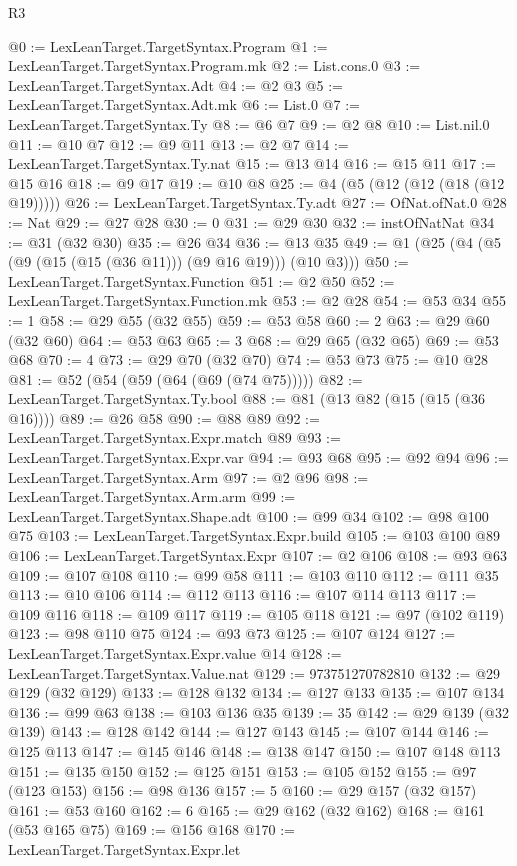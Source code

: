 \begin{lexlean}{R3}
\begin{coremodule}
@0 := LexLeanTarget.TargetSyntax.Program
@1 := LexLeanTarget.TargetSyntax.Program.mk
@2 := List.cons.{0}
@3 := LexLeanTarget.TargetSyntax.Adt
@4 := @2 @3
@5 := LexLeanTarget.TargetSyntax.Adt.mk
@6 := List.{0}
@7 := LexLeanTarget.TargetSyntax.Ty
@8 := @6 @7
@9 := @2 @8
@10 := List.nil.{0}
@11 := @10 @7
@12 := @9 @11
@13 := @2 @7
@14 := LexLeanTarget.TargetSyntax.Ty.nat
@15 := @13 @14
@16 := @15 @11
@17 := @15 @16
@18 := @9 @17
@19 := @10 @8
@25 := @4 (@5 (@12 (@12 (@18 (@12 @19)))))
@26 := LexLeanTarget.TargetSyntax.Ty.adt
@27 := OfNat.ofNat.{0}
@28 := Nat
@29 := @27 @28
@30 := 0
@31 := @29 @30
@32 := instOfNatNat
@34 := @31 (@32 @30)
@35 := @26 @34
@36 := @13 @35
@49 := @1 (@25 (@4 (@5 (@9 (@15 (@15 (@36 @11))) (@9 @16 @19))) (@10 @3)))
@50 := LexLeanTarget.TargetSyntax.Function
@51 := @2 @50
@52 := LexLeanTarget.TargetSyntax.Function.mk
@53 := @2 @28
@54 := @53 @34
@55 := 1
@58 := @29 @55 (@32 @55)
@59 := @53 @58
@60 := 2
@63 := @29 @60 (@32 @60)
@64 := @53 @63
@65 := 3
@68 := @29 @65 (@32 @65)
@69 := @53 @68
@70 := 4
@73 := @29 @70 (@32 @70)
@74 := @53 @73
@75 := @10 @28
@81 := @52 (@54 (@59 (@64 (@69 (@74 @75)))))
@82 := LexLeanTarget.TargetSyntax.Ty.bool
@88 := @81 (@13 @82 (@15 (@15 (@36 @16))))
@89 := @26 @58
@90 := @88 @89
@92 := LexLeanTarget.TargetSyntax.Expr.match @89
@93 := LexLeanTarget.TargetSyntax.Expr.var
@94 := @93 @68
@95 := @92 @94
@96 := LexLeanTarget.TargetSyntax.Arm
@97 := @2 @96
@98 := LexLeanTarget.TargetSyntax.Arm.arm
@99 := LexLeanTarget.TargetSyntax.Shape.adt
@100 := @99 @34
@102 := @98 @100 @75
@103 := LexLeanTarget.TargetSyntax.Expr.build
@105 := @103 @100 @89
@106 := LexLeanTarget.TargetSyntax.Expr
@107 := @2 @106
@108 := @93 @63
@109 := @107 @108
@110 := @99 @58
@111 := @103 @110
@112 := @111 @35
@113 := @10 @106
@114 := @112 @113
@116 := @107 @114 @113
@117 := @109 @116
@118 := @109 @117
@119 := @105 @118
@121 := @97 (@102 @119)
@123 := @98 @110 @75
@124 := @93 @73
@125 := @107 @124
@127 := LexLeanTarget.TargetSyntax.Expr.value @14
@128 := LexLeanTarget.TargetSyntax.Value.nat
@129 := 973751270782810
@132 := @29 @129 (@32 @129)
@133 := @128 @132
@134 := @127 @133
@135 := @107 @134
@136 := @99 @63
@138 := @103 @136 @35
@139 := 35
@142 := @29 @139 (@32 @139)
@143 := @128 @142
@144 := @127 @143
@145 := @107 @144
@146 := @125 @113
@147 := @145 @146
@148 := @138 @147
@150 := @107 @148 @113
@151 := @135 @150
@152 := @125 @151
@153 := @105 @152
@155 := @97 (@123 @153)
@156 := @98 @136
@157 := 5
@160 := @29 @157 (@32 @157)
@161 := @53 @160
@162 := 6
@165 := @29 @162 (@32 @162)
@168 := @161 (@53 @165 @75)
@169 := @156 @168
@170 := LexLeanTarget.TargetSyntax.Expr.let

\end{coremodule}
\end{lexlean}
